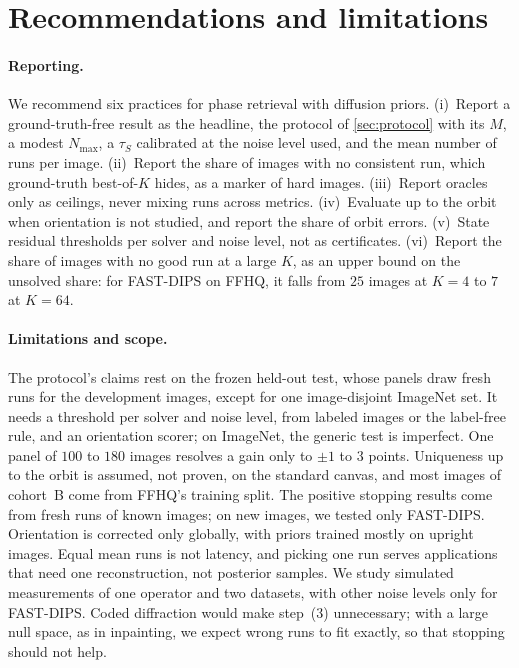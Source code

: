 \section{Recommendations and limitations}
\label{sec:discussion}

\paragraph{Reporting.}
We recommend six practices for phase retrieval with diffusion priors.
(i)~Report a ground-truth-free result as the headline, \eg the protocol of \cref{sec:protocol} with its $M$, a modest $N_{\max}$, a $\tau_S$ calibrated at the noise level used, and the mean number of runs per image.
(ii)~Report the share of images with no consistent run, which ground-truth best-of-$K$ hides, as a marker of hard images.
(iii)~Report oracles only as ceilings, never mixing runs across metrics.
(iv)~Evaluate up to the orbit when orientation is not studied, and report the share of orbit errors.
(v)~State residual thresholds per solver and noise level, not as certificates.
(vi)~Report the share of images with no good run at a large $K$, as an upper bound on the unsolved share: for FAST-DIPS on FFHQ, it falls from $25$ images at $K{=}4$ to $7$ at $K{=}64$.

\paragraph{Limitations and scope.}
The protocol's claims rest on the frozen held-out test, whose panels draw fresh runs for the development images, except for one image-disjoint ImageNet set.
It needs a threshold per solver and noise level, from labeled images or the label-free rule, and an orientation scorer; on ImageNet, the generic test is imperfect.
One panel of $100$ to $180$ images resolves a gain only to $\pm1$ to $3$ points.
Uniqueness up to the orbit is assumed, not proven, on the standard canvas, and most images of cohort~B come from FFHQ's training split.
The positive stopping results come from fresh runs of known images; on new images, we tested only FAST-DIPS.
Orientation is corrected only globally, with priors trained mostly on upright images.
Equal mean runs is not latency, and picking one run serves applications that need one reconstruction, not posterior samples.
We study simulated measurements of one operator and two datasets, with other noise levels only for FAST-DIPS.
Coded diffraction would make step~(3) unnecessary; with a large null space, as in inpainting, we expect wrong runs to fit exactly, so that stopping should not help.

